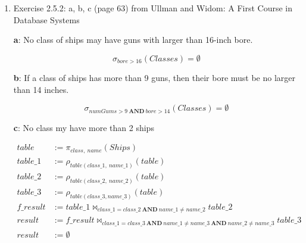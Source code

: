 \documentclass[a4paper,11pt]{article}
\newcommand{\selection}[2]{\sigma_{#1}\left(#2\right)}
\newcommand{\projection}[2]{\pi_{#1}\left(#2\right)}
\newcommand{\thJoin}[3]{#1 \Join_{#3} #2}
\newcommand{\rename}[3]{\rho_{#1(#2)}\left(#3\right)}
\begin{document}
\begin{enumerate}

		\pagebreak

		\item Exercise 2.5.2: a, b, c (page 63) from Ullman and Widom: A First Course in Database Systems

		\textbf{a}: No class of ships may have guns with larger than 16-inch bore.

		\begin{equation*}
			\selection{bore > 16}{Classes} = \emptyset
		\end{equation*}

		\textbf{b}: If a class of ships has more than 9 guns, then their bore must be no larger than 14 inches.

		\begin{equation*}
			\selection{numGums > 9\ \mathbf{AND}\ bore > 14}{Classes} = \emptyset
		\end{equation*}

		\textbf{c}: No class my have more than 2 ships

		\begin{align*}
			table &:= \projection{class,\ name}{Ships} \\
			table\_1 &:= \rename{table}{class\_1,\ name\_1}{table} \\
			table\_2 &:= \rename{table}{class\_2,\ name\_2}{table} \\
			table\_3 &:= \rename{table}{class\_3, name\_3}{table} \\
			f\_result &:= \thJoin{table\_1}{table\_2}{class\_1 = class\_2\ \mathbf{AND}\ name\_1\neq name\_2} \\
			result &:= \thJoin{f\_result}{table\_3}{class\_1=class\_3\ \mathbf{AND}\ name\_1\neq name\_3\ \mathbf{AND}\ name\_2\neq name\_3} \\
			result &:= \emptyset
		\end{align*}
	\end{enumerate}
\end{document}
